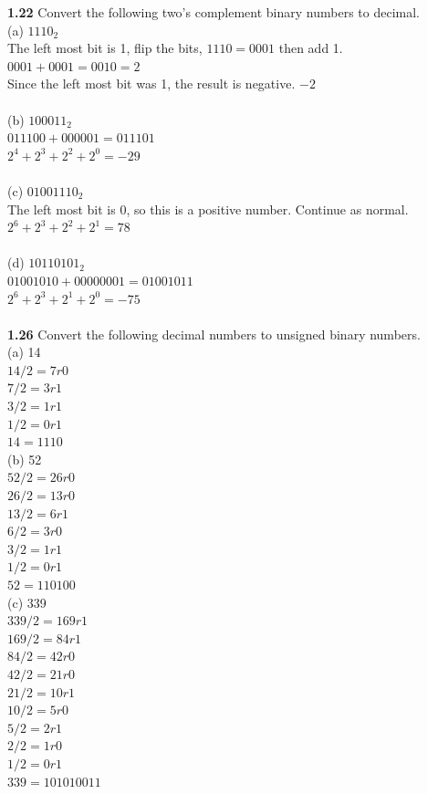 \documentclass[12pt,a4paper]{report}
\begin{document}
\begin{normalsize}
\textbf{1.22} Convert the following two's complement binary numbers to decimal. \\
(a) $ 1110_{2} $ \\ 
The left most bit is 1, flip the bits, $ 1110 = 0001 $ then add 1. $ 0001 + 0001 = 0010 = 2 $ \\
Since the left most bit was 1, the result is negative. $ -2 $ \\ \\
(b) $ 100011_{2} $ \\ 
$ 011100 + 000001 = 011101 $ \\
$ 2^{4} + 2^{3} + 2^{2} + 2^{0} = -29 $ \\ \\
(c) $ 01001110_{2} $ \\ 
The left most bit is 0, so this is a positive number. Continue as normal. \\
$ 2^{6} + 2^{3} + 2^{2} + 2^{1} = 78 $ \\ \\
(d) $ 10110101_{2} $ \\ 
$ 01001010 + 00000001 = 01001011 $ \\
$  2^{6} + 2^{3} + 2^{1} + 2^{0} = -75 $ \\ \\

\textbf{1.26} Convert the following decimal numbers to unsigned binary numbers. \\
(a) 14 \\
$ 14/2 = 7 r 0 $ \\
$ 7/2 = 3 r 1 $ \\
$ 3/2 = 1 r 1 $ \\
$ 1/2 = 0 r 1 $ \\
$ 14 = 1110 $ \\

(b) 52 \\
$ 52/2 = 26 r 0 $ \\
$ 26/2 = 13 r 0 $ \\
$ 13/2 = 6 r 1 $ \\
$ 6/2 = 3 r 0 $ \\
$ 3/2 = 1 r 1 $ \\
$ 1/2 = 0 r 1 $ \\
$ 52 = 110100 $ \\

(c) 339 \\
$ 339/2 = 169 r 1 $ \\
$ 169/2 = 84 r 1 $\\
$ 84/2 = 42 r 0 $\\
$ 42/2 = 21 r 0 $\\
$ 21/2 = 10 r 1 $\\
$ 10/2 = 5 r 0 $\\
$ 5/2 = 2 r 1 $\\
$ 2/2 = 1 r 0 $\\
$ 1/2 = 0 r 1 $\\
$ 339 = 101010011 $\\


\end{normalsize}
\end{document}
